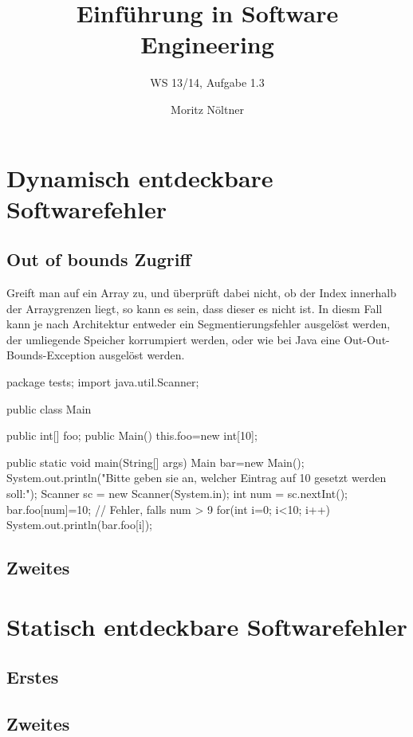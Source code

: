 \documentclass[ngerman]{scrartcl}
\begin{document}
\author{Moritz Nöltner}
\title{Einführung in Software Engineering}
\subtitle{WS 13/14, Aufgabe 1.3}

\maketitle
\begin{figure}[H] %
	\centering
\end{figure}

\section{Dynamisch entdeckbare Softwarefehler}
\subsection{Out of bounds Zugriff}
Greift man auf ein Array zu, und überprüft dabei nicht, ob der Index innerhalb der Arraygrenzen liegt, so kann es sein, dass dieser es nicht ist. In diesm Fall kann je nach Architektur entweder ein Segmentierungsfehler ausgelöst werden, der umliegende Speicher korrumpiert werden, oder wie bei Java eine Out-Out-Bounds-Exception ausgelöst werden.
\begin{Java}
package tests;
import java.util.Scanner;

public class Main {
	public int[] foo;
	public Main(){
		this.foo=new int[10];
	}

	public static void main(String[] args) {
		Main bar=new Main();
		System.out.println("Bitte geben sie an, welcher Eintrag auf 10 gesetzt werden soll:");
		Scanner sc = new Scanner(System.in);
		int num = sc.nextInt();
		bar.foo[num]=10;	// Fehler, falls num > 9
		for(int i=0; i<10; i++)
		{
			System.out.println(bar.foo[i]);
		}
	}
}
\end{Java}


\subsection{Zweites}

\section{Statisch entdeckbare Softwarefehler}
\subsection{Erstes}
\subsection{Zweites}
\end{document}
